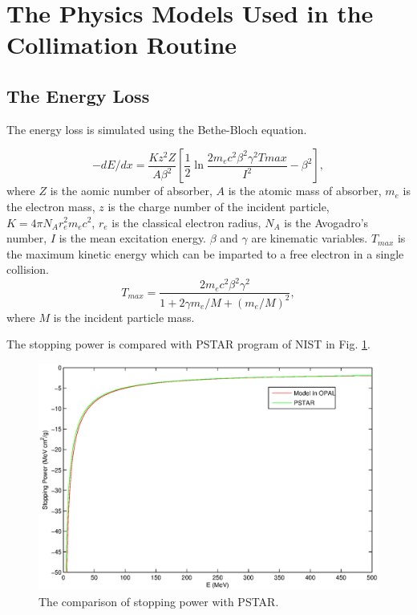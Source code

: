 \documentclass{article}
\begin{document}
\section{The Physics Models Used in the Collimation Routine}
\subsection{The Energy Loss}

The energy loss is simulated using the Bethe-Bloch equation.

\begin{equation}
\label{eq:dEdx}
-dE/dx=\frac{K z^2 Z}{A \beta^2}[\frac{1}{2} \ln\frac{2 m_e c^2\beta^2 \gamma^2 Tmax}{I^2}-\beta^2],
\end{equation}
where $Z$ is the aomic number of absorber, $A$ is the atomic mass of absorber, $m_e$ is the electron mass, $z$ is the charge number of the incident particle, $K=4\pi N_Ar_e^2m_ec^2$, $r_e$ is the classical electron radius, $N_A$ is the Avogadro's number, $I$ is the mean excitation energy. $\beta$ and $\gamma$ are kinematic variables. $T_{max}$ is the maximum kinetic energy which can be imparted to a free electron in a single collision.
\begin{equation}
T_{max}=\frac{2m_ec^2\beta^2\gamma^2}{1+2\gamma m_e/M+(m_e/M)^2},
\end{equation}
where $M$ is the incident particle mass.

The stopping power is compared with PSTAR program of NIST in Fig. \ref{fig:dEdx}.
\begin{figure}[H]
\begin{center}
\includegraphics*[width=1.0\textwidth]{dEdx}
\end{center}
\caption{The comparison of stopping power with PSTAR. }
\label{fig:dEdx}
\end{figure}
\end{document}
